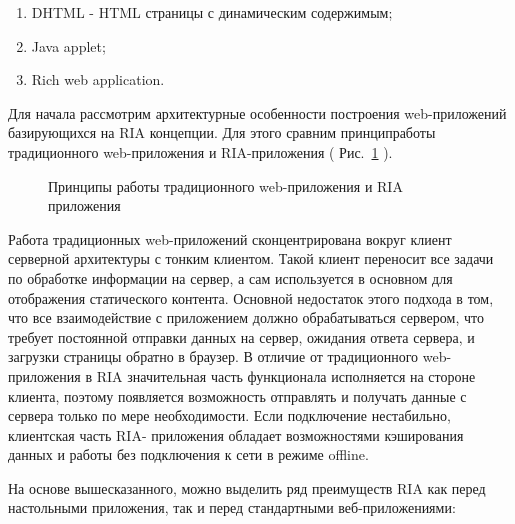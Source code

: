 \begin{enumerate}

\item DHTML - HTML страницы с динамическим содержимым;
\item Java applet; 
\item Rich web application. 

\end{enumerate}

Для начала рассмотрим архитектурные особенности построения web-приложений базирующихся 
на RIA  концепции.  Для этого сравним принципработы традиционного web-приложения и 
RIA-приложения ( Рис.~\ref{ris:principlesRIA.png} ).  
\begin{figure}[h]
\caption{Принципы работы традиционного web-приложения и RIA приложения}
\label{ris:principlesRIA.png}
\end{figure}

Работа традиционных web-приложений сконцентрирована вокруг клиент серверной архитектуры 
с тонким клиентом.  Такой клиент переносит все задачи по обработке информации на сервер, 
а сам используется в основном для отображения статического контента.  Основной 
недостаток этого подхода в том,  что все взаимодействие с приложением должно 
обрабатываться сервером,  что требует постоянной отправки данных на сервер,  
ожидания ответа сервера, и загрузки страницы обратно в браузер. В отличие от 
традиционного web-приложения в RIA  значительная часть функционала исполняется на 
стороне клиента,  поэтому появляется возможность отправлять и получать данные с сервера 
только по мере необходимости.  Если подключение нестабильно,  клиентская часть RIA- 
приложения обладает возможностями кэширования данных и работы без подключения к сети в 
режиме offline.

На основе вышесказанного, можно выделить ряд преимуществ RIA  как перед настольными приложения, 
так и перед стандартными веб-приложениями:

